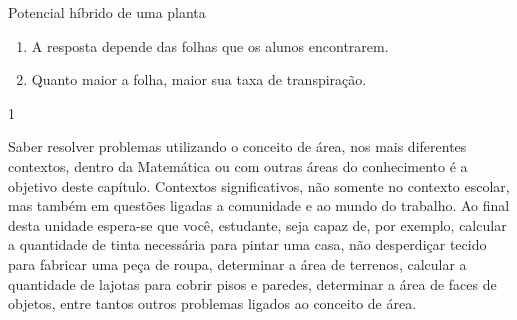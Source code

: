 \begin{answer}{Potencial híbrido de uma planta}
{
  \begin{enumerate}
  \item A resposta depende das folhas que os alunos encontrarem.

  \item Quanto maior a folha, maior sua taxa de transpiração.
  \end{enumerate}
}{1}
\end{answer}

Saber resolver problemas utilizando o conceito de área, nos mais diferentes contextos, dentro da Matemática ou com outras áreas do conhecimento é a objetivo deste capítulo. Contextos significativos, não somente no contexto escolar, mas também em questões ligadas a comunidade e ao mundo do trabalho. Ao final desta unidade espera-se que você, estudante, seja capaz de, por exemplo,  calcular a quantidade de tinta necessária para pintar uma casa, não desperdiçar tecido para fabricar uma peça de roupa, determinar a área de terrenos, calcular a quantidade de lajotas para cobrir pisos e paredes, determinar a área de faces de objetos, entre tantos outros problemas ligados ao conceito de área.

